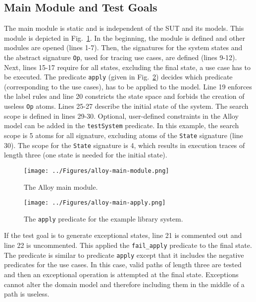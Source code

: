 \subsection{Main Module and Test Goals}
\label{sec:alloy-main-module}
The main module is static and is independent of the SUT and its models. This module is depicted in Fig.~\ref{fig:alloy-main-module}. In the beginning, the module is defined and other modules are opened (lines 1-7). Then, the signatures for the system states and the abstract signature \texttt{Op}, used for tracing use cases, are defined (lines 9-12). Next, lines 15-17 require for all states, excluding the final state, a use case has to be executed. The predicate \texttt{apply} (given in Fig.~\ref{fig:alloy-main-apply}) decides which predicate (corresponding to the use cases), has to be applied to the model. Line 19 enforces the label rules and line 20 constricts the state space and forbids the creation of useless \texttt{Op} atoms. Lines 25-27 describe the initial state of the system. The search scope is defined in lines 29-30. Optional, user-defined constraints in the Alloy model can be added in the \texttt{testSystem} predicate. In this example, the search scope is 5 atoms for all signature, excluding atoms of the \texttt{State} signature (line 30). The scope for the \texttt{State} signature is 4, which results in execution traces of length three (one state is needed for the initial state).

\begin{figure}[h]
\centering
\texttt{[image: ../Figures/alloy-main-module.png]}
\caption{The Alloy main module.}
\label{fig:alloy-main-module}
\end{figure}

\begin{figure}[h]
\centering
\texttt{[image: ../Figures/alloy-main-apply.png]}
\caption{The \texttt{apply} predicate for the example library system.}
\label{fig:alloy-main-apply}
\end{figure}

If the test goal is to generate exceptional states, line 21 is commented out and line 22 is uncommented. This applied the \texttt{fail\_apply} predicate to the final state. The predicate is similar to predicate \texttt{apply} except that it includes the negative predicates for the use cases. In this case, valid paths of length three are tested and then an exceptional operation is attempted at the final state. Exceptions cannot alter the domain model and therefore including them in the middle of a path is useless.


